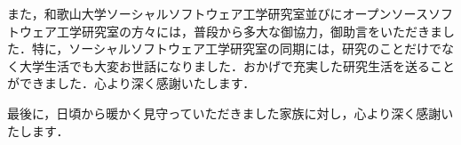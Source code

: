 \documentclass[11pt,dvipdfmx]{jreport}
\begin{document}
また，和歌山大学ソーシャルソフトウェア工学研究室並びにオープンソースソフトウェア工学研究室の方々には，普段から多大な御協力，御助言をいただきました．特に，ソーシャルソフトウェア工学研究室の同期には，研究のことだけでなく大学生活でも大変お世話になりました．おかげで充実した研究生活を送ることができました．心より深く感謝いたします．

最後に，日頃から暖かく見守っていただきました家族に対し，心より深く感謝いたします．












% 
% 
% 

\end{document}
